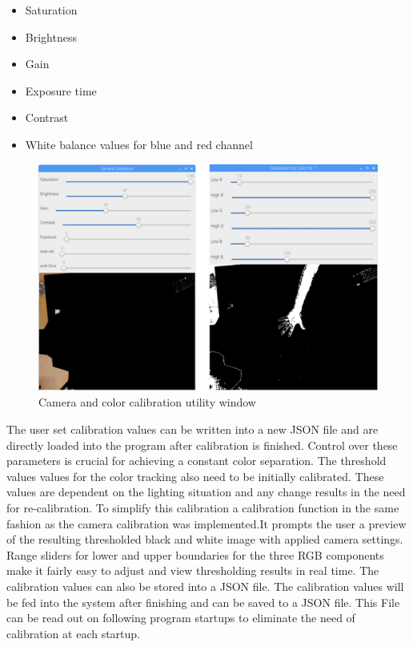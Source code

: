 \begin{itemize}
\item Saturation
\item Brightness
\item Gain
\item Exposure time
\item Contrast
\item White balance values for blue and red channel
\end{itemize}
\begin{figure}[H]
\includegraphics[width=\textwidth]{images/calib_windows.jpg}
\caption{Camera and color calibration utility window}
\label{fig:calibration_windows} 
\end{figure}
The user set calibration values can be written into a new JSON file and are directly loaded into the program after calibration is finished. Control over these parameters is crucial for achieving a constant color separation. \newpage The threshold values values for the color tracking also need to be initially calibrated. These values are dependent on the lighting situation and any change results in the need for re-calibration. To simplify this calibration a calibration function in the same fashion as the camera calibration was implemented.It prompts the user a preview of the resulting thresholded black and white image with applied camera settings. Range sliders for lower and upper boundaries for the three RGB components make it fairly easy to adjust and view thresholding results in real time. The calibration values can also be stored into a JSON file. The calibration values will be fed into the system after finishing and can be saved to a JSON file. This File can be read out on following program startups to eliminate the need of calibration at each startup.
